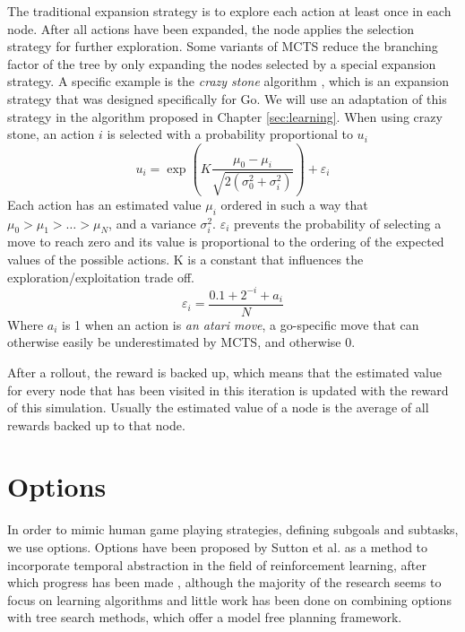 The traditional expansion strategy is to explore each action at least once in
each node. After all actions have been expanded, the node applies the selection
strategy for further exploration. Some variants of MCTS reduce the branching
factor of the tree by only expanding the nodes selected by a special expansion
strategy. A specific example is the \emph{crazy stone} algorithm
\cite{coulom2007efficient}, which is an expansion strategy that was designed
specifically for Go. We will use an adaptation of this strategy in the algorithm
proposed in Chapter \ref{sec:learning}.  When using crazy stone, an action $i$
is selected with a probability proportional to $u_i$
\begin{equation}
	\label{eq:crazystone}
	u_i = \exp\left(K \frac{\mu_0 - \mu_i}{\sqrt{2\left(\sigma_0^2 +
\sigma_i^2\right)}}\right) + \varepsilon_i
\end{equation}
Each action has an estimated value $\mu_i$ ordered in such a way that $\mu_0 >
\mu_1 > \ldots > \mu_N$, and a variance $\sigma_i^2$. $\varepsilon_i$ prevents 
the probability of selecting a move to reach zero and its value is proportional to
the ordering of the expected values of the possible actions. K is a constant
that influences the exploration/exploitation trade off.
\begin{equation}
	\label{eq:epsilon}
	\varepsilon_i = \frac{0.1 + 2^{-i} + a_i}{N}
\end{equation}
Where $a_i$ is 1 when an action is \emph{an atari move}, a go-specific
move that can otherwise easily be underestimated by MCTS, and otherwise 0.

After a rollout, the reward is backed up, which means that the estimated value
for every node that has been visited in this iteration is updated with the
reward of this simulation. Usually the estimated value of a node is the average
of all rewards backed up to that node.


\section{Options}
\label{subsec:options}

In order to mimic human game playing strategies, defining subgoals and subtasks,
we use options. Options have been proposed by Sutton et al.
\cite{sutton1999between} as a method to incorporate temporal abstraction in the
field of reinforcement learning, after which progress has been made
\cite{barto2003recent}, although the majority of the research seems to focus on
learning algorithms and little work has been done on combining options with tree
search methods, which offer a model free planning framework.

